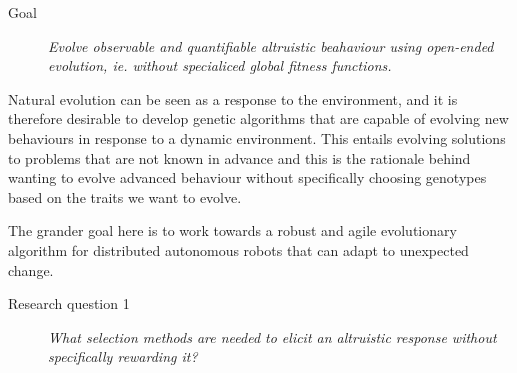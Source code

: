 \documentclass[a4paper]{book}
\begin{document}

\begin{description}
\item[Goal] {\it Evolve observable and quantifiable altruistic beahaviour using open-ended evolution, ie. without specialiced global fitness functions.}
\end{description}

Natural evolution can be seen as a response to the environment, and it is therefore desirable to develop genetic algorithms that are capable of evolving new behaviours in response to a dynamic environment. This entails evolving solutions to problems that are not known in advance and this is the rationale behind wanting to evolve advanced behaviour without specifically choosing genotypes based on the traits we want to evolve. 

The grander goal here is to work towards a robust and agile evolutionary algorithm for distributed autonomous robots that can adapt to unexpected change.



\begin{description}
\item[Research question 1] {\it What selection methods are needed to elicit an altruistic response without specifically rewarding it?}
\end{description}
\end{document}
